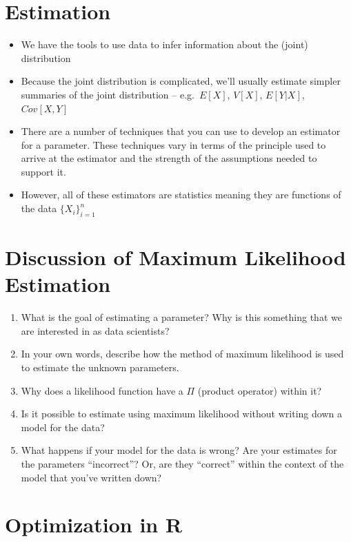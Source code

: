 \documentclass[
]{book}
\providecommand{\tightlist}{%
  \setlength{\itemsep}{0pt}\setlength{\parskip}{0pt}}
\theoremstyle{definition}
\theoremstyle{definition}
\theoremstyle{definition}
\theoremstyle{definition}
\theoremstyle{remark}
\begin{document}
\hypertarget{estimation-1}{%
\section{Estimation}\label{estimation-1}}

\begin{itemize}
\item
  We have the tools to use data to infer information about the (joint) distribution
\item
  Because the joint distribution is complicated, we'll usually estimate simpler summaries of the joint distribution -- e.g.~\(E[X]\), \(V[X]\), \(E[Y|X]\), \(Cov[X,Y]\)
\item
  There are a number of techniques that you can use to develop an estimator for a parameter. These techniques vary in terms of the principle used to arrive at the estimator and the strength of the assumptions needed to support it.
\item
  However, all of these estimators are statistics meaning they are functions of the data \(\{X_i\}_{i=1}^n\)
\end{itemize}

\hypertarget{discussion-of-maximum-likelihood-estimation}{%
\section{Discussion of Maximum Likelihood Estimation}\label{discussion-of-maximum-likelihood-estimation}}

\begin{enumerate}
\def\labelenumi{\arabic{enumi}.}
\tightlist
\item
  What is the goal of estimating a parameter? Why is this something that we are interested in as data scientists?
\item
  In your own words, describe how the method of maximum likelihood is used to estimate the unknown parameters.
\item
  Why does a likelihood function have a \(\Pi\) (product operator) within it?
\item
  Is it possible to estimate using maximum likelihood without writing down a model for the data?
\item
  What happens if your model for the data is wrong? Are your estimates for the parameters ``incorrect''? Or, are they ``correct'' within the context of the model that you've written down?
\end{enumerate}

\hypertarget{optimization-in-r}{%
\section{Optimization in R}\label{optimization-in-r}}
\end{document}
